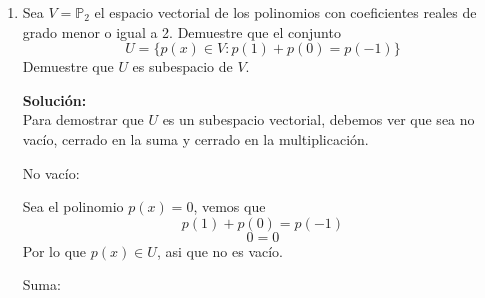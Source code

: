 \documentclass[12pt]{article}
\newenvironment{solucion}
{\begin{mdframed}[backgroundcolor=black!10]
		{\bf Solución:}\\
	}
	{
	\end{mdframed}
}
\newenvironment{preguntas}
{\begin{enumerate}\itemsep12pt
	}
	{
	\end{enumerate}
}
\begin{document}
\begin{preguntas}
\begin{solucion}
Sea $A_1$ la matriz $A$ con la columna $i$ reemplazada por el vector $b$, se cumple que
$$x_i = \dfrac{|A_i|}{|A|}$$
Como lo que queremos obtener es la segunda columna de la inversa de $A$, el sistema que debemos resolver es
$$Ax = e_2$$
Para aplicar cramer, en primer lugar calculemos el determinante de $A$, esto es
$$|A| = \left|  \left[ \begin{array}{rrr} 2&1&0\\ 0&1&2\\ 1&2&0 \end{array} \right] \right| = 2\cdot (-4) - (-2) = -6$$
Luego,
$$x_1 = 
\dfrac{\left|  \left[ \begin{array}{rrr} 0&1&0\\ 1&1&2\\ 0&2&0 \end{array} \right] \right|}{|A|} = 
\dfrac{0}{-6} = 0$$
$$x_2 = 
\dfrac{\left|  \left[ \begin{array}{rrr} 2&0&0\\ 0&1&2\\ 1&0&0 \end{array} \right] \right|}{|A|} = 
\dfrac{0}{-6} = 0$$
$$x_3 = 
\dfrac{\left|  \left[ \begin{array}{rrr} 2&1&0\\ 0&1&1\\ 1&2&0 \end{array} \right] \right|}{|A|} = 
\dfrac{2\cdot 1 - (-1)}{-6} = \dfrac{1}{2}$$
Finalmente,
$$x = \begin{pmatrix}
0 \\ 0 \\ \frac{1}{2}
\end{pmatrix}$$
Que corresponde a la segunda columna de la inversa de $A$.
\end{solucion}
\item Sea $V = \mathbb{P}_2$ el espacio vectorial de los polinomios con coeficientes reales de grado menor o igual a 2. Demuestre que el conjunto
	$$U=\{p(x) \in V : p(1) + p(0) = p(-1)\}$$
	Demuestre que $U$ es subespacio de $V$.
\begin{solucion}
Para demostrar que $U$ es un subespacio vectorial, debemos ver que sea no vacío, cerrado en la suma y cerrado en la multiplicación.
		
		No vacío:
		
		Sea el polinomio $p(x) = 0$, vemos que
		$$p(1) + p(0) =p(-1)$$
		$$0 = 0$$
		Por lo que $p(x) \in U$, asi que no es vacío.
		
		Suma:
		

\end{solucion}
\end{preguntas}
\end{document}
